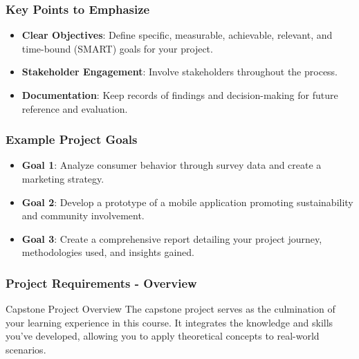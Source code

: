 \documentclass[aspectratio=169]{beamer}
\begin{document}
\begin{frame}[fragile]
    \frametitle{Key Points to Emphasize}
    \begin{itemize}
        \item \textbf{Clear Objectives}: Define specific, measurable, achievable, relevant, and time-bound (SMART) goals for your project.
        \item \textbf{Stakeholder Engagement}: Involve stakeholders throughout the process.
        \item \textbf{Documentation}: Keep records of findings and decision-making for future reference and evaluation.
    \end{itemize}
\end{frame}

\begin{frame}[fragile]
    \frametitle{Example Project Goals}
    \begin{itemize}
        \item \textbf{Goal 1}: Analyze consumer behavior through survey data and create a marketing strategy.
        \item \textbf{Goal 2}: Develop a prototype of a mobile application promoting sustainability and community involvement.
        \item \textbf{Goal 3}: Create a comprehensive report detailing your project journey, methodologies used, and insights gained.
    \end{itemize}
\end{frame}

\begin{frame}[fragile]
    \frametitle{Project Requirements - Overview}
    \begin{block}{Capstone Project Overview}
        The capstone project serves as the culmination of your learning experience in this course. 
        It integrates the knowledge and skills you've developed, allowing you to apply theoretical concepts 
        to real-world scenarios.
    \end{block}
\end{frame}
\end{document}
